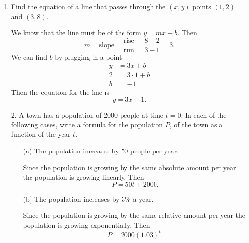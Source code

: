 \documentclass[11pt]{article}
\begin{document}
\pagestyle{empty}
\newsavebox{\quizfront}
\begin{lrbox}{\quizfront}
\begin{minipage}[top][4.5in][t]{\textwidth} \setlength{\parindent}{1.5em}
\drawtitle
\vspace{-0.5in}
\begin{enumerate}

\item Find the equation of a line that passes through the $(x, y)$
  points $(1, 2)$ and $(3, 8)$.

  {\color{blue}
    We know that the line must be of the form $y= mx + b$.  Then
    \[
    m = \text{slope} = \frac{\text{rise}}{\text{run}} = \frac{8 - 2}{3
      - 1} = 3.
    \]
    We can find $b$ by plugging in a point
    \begin{align*}
      y & = 3x + b\\
      2 & = 3\cdot 1 + b\\
      b & = -1.
    \end{align*}
    Then the equation for the line is
    \[
    y = 3x - 1.
    \]
  }
  \vfill

\end{enumerate}





\end{minipage}
\end{lrbox}

\newsavebox{\quizback}
\begin{lrbox}{\quizback}
\begin{minipage}[top][4.5in][t]{\textwidth} \setlength{\parindent}{1.5em}
\begin{itemize}
\item[2.] A town has a population of 2000 people at time $t = 0$.  In
  each of the following cases, write a formula for the population $P$,
  of the town as a function of the year $t$.
  \begin{itemize}
  \item[(a)] The population increases by $50$ people per year.
    \vfill
    {\color{blue}

      Since the population is growing by the same absolute amount per
      year the population is growing linearly.  Then
      \[
      P = 50t + 2000.
      \]

    }
    \vfill
  \item[(b)] The population increases by 3\% a year.
    \vfill
    {\color{blue}

      Since the population is growing by the same relative amount per
      year the population is growing exponentially.  Then
      \[
      P = 2000(1.03)^t.
      \]

    }
    \vfill
  \end{itemize}


\end{itemize}
\end{minipage}
\end{lrbox}
\end{document}
